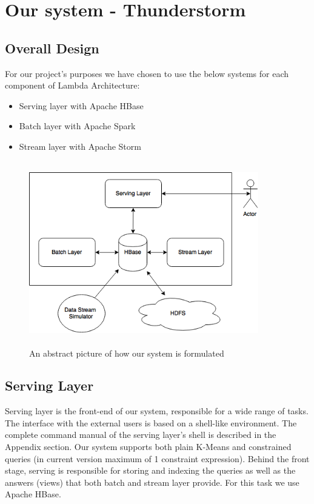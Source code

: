 \documentclass{lmproj}
\begin{document}
\chapter{Our system - Thunderstorm}
\label{systemdescr}

\section{Overall Design}
\label{systemdescr}

For our project's purposes we have chosen to use the below systems for each component of Lambda Architecture:

\begin{itemize}
	\item Serving layer with Apache HBase
	\item Batch layer with Apache Spark
	\item Stream layer with Apache Storm
\end{itemize}

\begin{figure}[h]
\centering
\includegraphics[width=10cm, height=8cm]{system}
\caption{An abstract picture of how our system is formulated}
\end{figure}


\section{Serving Layer}
\label{systemdescr}


Serving layer is the front-end of our system, responsible for a wide range of tasks. The interface with the external users is based on a shell-like environment. The complete command manual of the serving layer's shell is described in the Appendix section. Our system supports both plain K-Means and constrained queries (in current version maximum of 1 constraint expression). Behind the front stage, serving is responsible for storing and indexing the queries as well as the answers (views) that both batch and stream layer provide. For this task we use Apache HBase.
\end{document}
